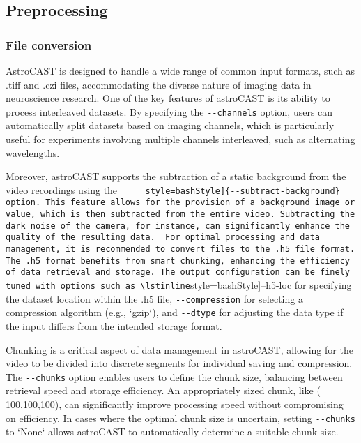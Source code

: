 \subsection{Preprocessing}

\subsubsection{File conversion}

AstroCAST is designed to handle a wide range of common input formats, such as .tiff and .czi files, accommodating the
diverse nature of imaging data in neuroscience research. One of the key features of astroCAST is its ability to
process interleaved datasets. By specifying the \lstinline[style=bashStyle]{--channels} option, users can
automatically split datasets based on imaging channels, which is particularly useful for experiments involving
multiple channels interleaved, such as alternating wavelengths.

Moreover, astroCAST supports the subtraction of a static background from the video recordings using the \lstinline[
    style=bashStyle]{--subtract-background} option. This feature allows for the provision of a background image or
value, which is then subtracted from the entire video. Subtracting the dark noise of the camera, for instance, can
significantly enhance the quality of the resulting data.

For optimal processing and data management, it is recommended to convert files to the .h5 file format. The .h5 format
benefits from smart chunking, enhancing the efficiency of data retrieval and storage. The output configuration can be
finely tuned with options such as \lstinline[style=bashStyle]{--h5-loc} for specifying the dataset location within
the .h5 file, \lstinline[style=bashStyle]{--compression} for selecting a compression algorithm (e.g., `gzip`), and \lstinline[style=bashStyle]{--dtype} for adjusting the data type if the input differs from the intended storage format.

Chunking is a critical aspect of data management in astroCAST, allowing for the video to be divided into discrete
segments for individual saving and compression. The \lstinline[style=bashStyle]{--chunks} option enables users to
define the chunk size, balancing between retrieval speed and storage efficiency. An appropriately sized chunk, like (
100,100,100), can significantly improve processing speed without compromising on efficiency. In cases where the
optimal chunk size is uncertain, setting \lstinline[style=bashStyle]{--chunks} to `None` allows astroCAST to
automatically determine a suitable chunk size.

